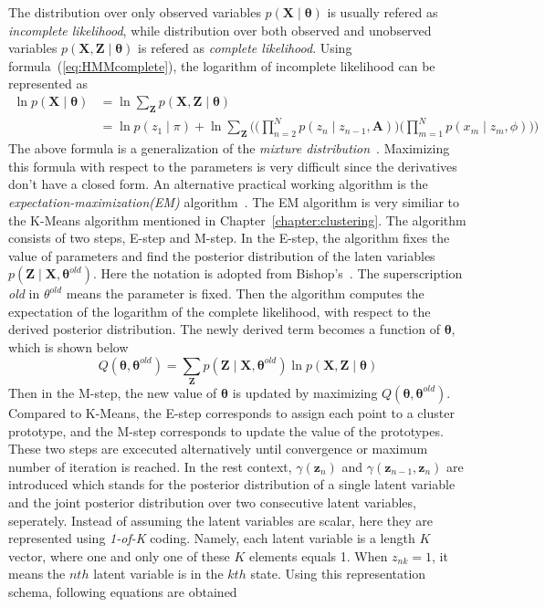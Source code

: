 The distribution over only observed variables \(p(\mathbf{X} \mid \boldsymbol{\theta})\) is usually refered as \textit{incomplete likelihood}, while distribution over both observed and unobserved variables \(p(\mathbf{X}, \mathbf{Z} \mid \boldsymbol{\theta})\) is refered as \textit{complete likelihood}. Using formula~(\ref{eq:HMMcomplete}), the logarithm of incomplete likelihood can be represented as
\begin{equation}
	\begin{split}
		\ln p(\mathbf{X} \mid \boldsymbol{\theta}) & = \ln \sum_{\mathbf{Z}}p(\mathbf{X}, \mathbf{Z} \mid \boldsymbol{\theta}) \\
										   & = \ln p(z_1 \mid \pi)  + \ln \sum_{\mathbf{Z}}\Big( \big(\prod_{n=2}^{N}p(z_n\mid z_{n-1}, \mathbf{A})\big) \big(\prod_{m=1}^{N}p(x_m\mid z_m, \phi)\big)\Big)
	\end{split}
\end{equation}
The above formula is a generalization of the \textit{mixture distribution}~\cite{PRML}. Maximizing this formula with respect to the parameters is very difficult since the derivatives don't have a closed form. An alternative practical working algorithm is the \textit{expectation-maximization(EM)} algorithm~\cite{dempster1977maximum}\cite{mclachlan2007algorithm}. The EM algorithm is very similiar to the K-Means algorithm mentioned in Chapter~\ref{chapter:clustering}. The algorithm consists of two steps, E-step and M-step. In the E-step, the algorithm fixes the value of parameters and find the posterior distribution of the laten variables \(p(\mathbf{Z} \mid \mathbf{X}, \boldsymbol{\theta}^{old})\). Here the notation is adopted from Bishop's~\cite{PRML}. The superscription \textit{old} in \(\theta^{old}\) means the parameter is fixed. Then the algorithm computes the expectation of the logarithm of the complete likelihood, with respect to the derived posterior distribution. The newly derived term becomes a function of \(\boldsymbol{\theta}\), which is shown below
\begin{equation}
	Q(\boldsymbol{\theta}, \boldsymbol{\theta}^{old}) = \sum_{\mathbf{Z}}p(\mathbf{Z}\mid \mathbf{X}, \boldsymbol{\theta}^{old})\ln p(\mathbf{X}, \mathbf{Z} \mid \boldsymbol{\theta})
\end{equation}
Then in the M-step,  the new value of \(\boldsymbol{\theta}\) is updated by maximizing \(Q(\boldsymbol{\theta}, \boldsymbol{\theta}^{old})\). Compared to K-Means, the E-step corresponds to assign each point to a cluster prototype, and the M-step corresponds to update the value of the prototypes. These two steps are excecuted alternatively until convergence or maximum number of iteration is reached. In the rest context, \(\gamma(\mathbf{z}_n)\) and \(\gamma(\mathbf{z}_{n-1}, \mathbf{z}_n)\) are introduced which stands for the posterior distribution of a single latent variable and the joint posterior distribution over two consecutive latent variables, seperately. Instead of assuming the latent variables are scalar, here they are represented using \textit{1-of-K} coding. Namely, each latent variable is a length \(K\) vector, where one and only one of these \(K\) elements equals 1. When \(z_{nk} = 1\), it means the \(nth\) latent variable is in the \(kth\) state. Using this representation schema, following equations are obtained
